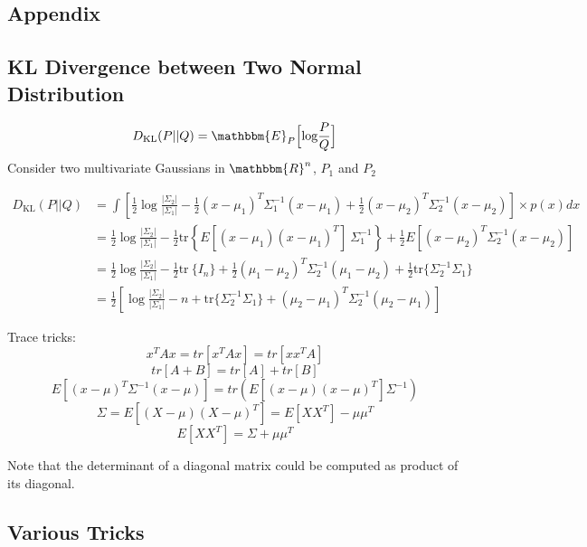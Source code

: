 \renewcommand{\thesection}{\Alph{section}.\arabic{section}}
\setcounter{section}{0}

\begin{appendices}
\chapter{Appendix}

\section{KL Divergence between Two Normal Distribution}
\begin{align*}
D_\text{KL}(P||Q) & = \mathbbm{E}_P\Big[\textrm{log}\frac{P}{Q}\Big]\\
\end{align*}
Consider two multivariate Gaussians in $\mathbbm{R}^n$, $P_1$ and $P_2$

\begin{align*}
D_\text{KL}(P||Q) &= \int \left[ \frac{1}{2} \log\frac{|\Sigma_2|}{|\Sigma_1|} - \frac{1}{2} (x-\mu_1)^T\Sigma_1^{-1}(x-\mu_1) + \frac{1}{2} (x-\mu_2)^T\Sigma_2^{-1}(x-\mu_2) \right] \times p(x) dx \\
&= \frac{1}{2} \log\frac{|\Sigma_2|}{|\Sigma_1|} - \frac{1}{2} \text{tr} \left\{E[(x - \mu_1)(x - \mu_1)^T] \ \Sigma_1^{-1} \right\} + \frac{1}{2} E[(x - \mu_2)^T \Sigma_2^{-1} (x - \mu_2)] \\
&= \frac{1}{2} \log\frac{|\Sigma_2|}{|\Sigma_1|} - \frac{1}{2} \text{tr}\ \{I_n \} + \frac{1}{2} (\mu_1 - \mu_2)^T \Sigma_2^{-1} (\mu_1 - \mu_2) + \frac{1}{2} \text{tr} \{ \Sigma_2^{-1} \Sigma_1 \} \\
&= \frac{1}{2}\left[\log\frac{|\Sigma_2|}{|\Sigma_1|} - n + \text{tr} \{ \Sigma_2^{-1}\Sigma_1 \} + (\mu_2 - \mu_1)^T \Sigma_2^{-1}(\mu_2 - \mu_1)\right]
\end{align*}

Trace tricks:
$$x^TAx = tr[x^TAx] = tr[xx^TA]$$
$$tr[A+B] = tr[A]+tr[B]$$
$$E[(x-\mu)^T \Sigma^{-1} (x-\mu)]= tr(E[(x-\mu)(x-\mu)^T] \Sigma^{-1})$$
$$\Sigma = E[(X-\mu)(X-\mu)^T]=E[XX^T]-\mu\mu^T$$
$$E[XX^T] = \Sigma + \mu\mu^T$$

Note that the determinant of a diagonal matrix could be computed as product of its diagonal.


\section{Various Tricks}


\end{appendices}
